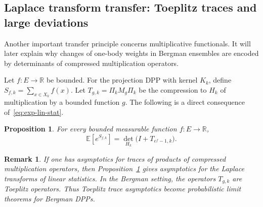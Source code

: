 \documentclass[12pt,a4paper,reqno]{article}
\theoremstyle{thmstyleone}
\newtheorem{proposition}[theorem]{Proposition}
\theoremstyle{thmstylethree}
\theoremstyle{thmstyletwo}
\newtheorem{remark}[theorem]{Remark}
\numberwithin{equation}{subsection}
\def\leq{\leqslant}
\begin{document}
\subsection{Laplace transform transfer: Toeplitz traces and large deviations}

Another important transfer principle concerns multiplicative functionals. It will later explain why changes of one-body weights in Bergman ensembles are encoded by determinants of compressed multiplication operators.

Let $f:E\to\mathbb R$ be bounded. For the projection DPP with kernel $K_k$, define $S_{f,k}=\sum_{x\in X_k}f(x).$ Let $T_{g,k}=\Pi_k M_g\Pi_k$ be the compression to $H_k$ of multiplication by a bounded function $g$. The following is a direct consequence of~\eqref{eq:exp-lin-stat}.

\begin{proposition}\label{prop:multiplicative-transfer}
For every bounded measurable function $f:E\to\mathbb R$,
\begin{equation}
\mathbb E\left[e^{S_{f,k}}\right]=\det_{H_k}\big(I+T_{e^f-1,k}\big).
\end{equation}
\end{proposition}


\begin{remark}
If one has asymptotics for traces of products of compressed multiplication operators, then Proposition~\ref{prop:multiplicative-transfer} gives asymptotics for the Laplace transforms of linear statistics. In the Bergman setting, the operators $T_{g,k}$ are Toeplitz operators. Thus Toeplitz trace asymptotics become probabilistic limit theorems for Bergman DPPs.
\end{remark}
\end{document}

